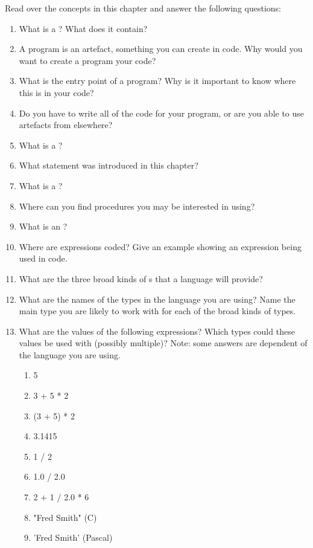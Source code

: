 Read over the concepts in this chapter and answer the following questions:
\begin{enumerate}
  \item What is a ? What does it contain?
  \item A program is an artefact, something you can create in code. Why would you want to create a program your code?
  \item What is the entry point of a program? Why is it important to know where this is in your code?
  \item Do you have to write all of the code for your program, or are you able to use artefacts from elsewhere?
  \item What is a ?
  \item What statement was introduced in this chapter?
  \item What is a ?
  \item Where can you find procedures you may be interested in using?
  \item What is an ?
  \item Where are expressions coded? Give an example showing an expression being used in code.
  \item What are the three broad kinds of s that a language will provide?
  \item What are the names of the types in the language you are using? Name the main type you are likely to work with for each of the broad kinds of types.
  \item What are the values of the following expressions? Which types could these values be used with (possibly multiple)? Note: some answers are dependent of the language you are using.
  \begin{multicols}{3}
  \begin{enumerate}
    \item 5
    \item 3 + 5 * 2
    \item (3 + 5) * 2
    \item 3.1415
    \item 1 / 2 
    \item 1.0 / 2.0
    \item 2 + 1 / 2.0 * 6
    \item "Fred Smith" (C)
    \item 'Fred Smith' (Pascal)
  \end{enumerate} 
  \end{multicols}

\end{enumerate}
